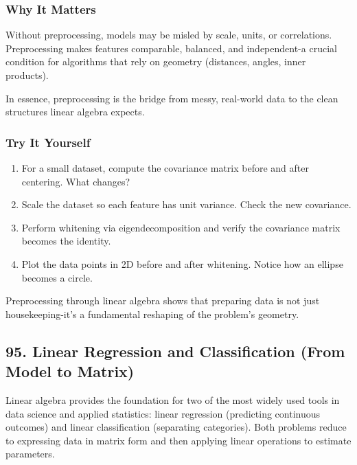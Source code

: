 \documentclass[
  letterpaper,
  DIV=11,
  numbers=noendperiod]{scrreprt}
\providecommand{\tightlist}{%
  \setlength{\itemsep}{0pt}\setlength{\parskip}{0pt}}
\begin{document}
\subsubsection{Why It Matters}\label{why-it-matters-89}

Without preprocessing, models may be misled by scale, units, or
correlations. Preprocessing makes features comparable, balanced, and
independent-a crucial condition for algorithms that rely on geometry
(distances, angles, inner products).

In essence, preprocessing is the bridge from messy, real-world data to
the clean structures linear algebra expects.

\subsubsection{Try It Yourself}\label{try-it-yourself-93}

\begin{enumerate}
\def\labelenumi{\arabic{enumi}.}
\tightlist
\item
  For a small dataset, compute the covariance matrix before and after
  centering. What changes?
\item
  Scale the dataset so each feature has unit variance. Check the new
  covariance.
\item
  Perform whitening via eigendecomposition and verify the covariance
  matrix becomes the identity.
\item
  Plot the data points in 2D before and after whitening. Notice how an
  ellipse becomes a circle.
\end{enumerate}

Preprocessing through linear algebra shows that preparing data is not
just housekeeping-it's a fundamental reshaping of the problem's
geometry.

\subsection{95. Linear Regression and Classification (From Model to
Matrix)}\label{linear-regression-and-classification-from-model-to-matrix}

Linear algebra provides the foundation for two of the most widely used
tools in data science and applied statistics: linear regression
(predicting continuous outcomes) and linear classification (separating
categories). Both problems reduce to expressing data in matrix form and
then applying linear operations to estimate parameters.
\end{document}
